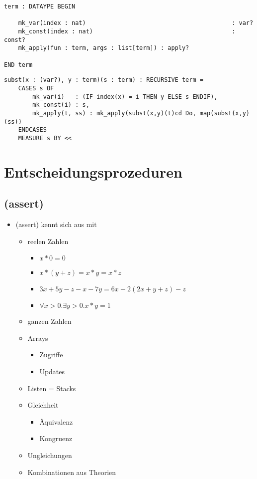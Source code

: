 \documentclass{scrartcl}
\begin{document}
\begin{lstlisting}
term : DATAYPE BEGIN

	mk_var(index : nat)											: var?
	mk_const(index : nat)										: const?
	mk_apply(fun : term, args : list[term])	: apply?

END term
\end{lstlisting}

\begin{lstlisting}
subst(x : (var?), y : term)(s : term) : RECURSIVE term =
	CASES s OF
		mk_var(i)	: (IF index(x) = i THEN y ELSE s ENDIF),
		mk_const(i)	: s,
		mk_apply(t, ss)	: mk_apply(subst(x,y)(t)cd Do, map(subst(x,y)(ss))
	ENDCASES
	MEASURE s BY <<
\end{lstlisting}

\section{Entscheidungsprozeduren}

\subsection{(assert)}

\begin{itemize}
	\item (assert) kennt sich aus mit
	\begin{itemize}
		\item reelen Zahlen
		\begin{itemize}
			\item $ x * 0 = 0 $
			\item $ x * (y + z) = x * y = x * z $
			\item $ 3x +5y - z - x -7y = 6x - 2(2x + y + z) - z $
			\item $ \forall x > 0 . \exists y > 0 .x * y = 1 $
		\end{itemize}
		\item ganzen Zahlen
		\item Arrays
		\begin{itemize}
			\item Zugriffe
			\item Updates
		\end{itemize}
		\item Listen = Stacks
		\item Gleichheit
		\begin{itemize}
			\item Äquivalenz
			\item Kongruenz
		\end{itemize}
		\item Ungleichungen
		\item Kombinationen aus Theorien
	\end{itemize}
\end{itemize}
\end{document}
